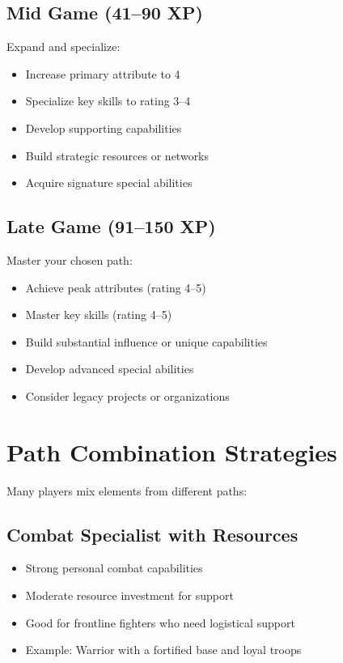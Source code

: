 \documentclass[11pt,twoside,openany]{book}
\begin{document}
\subsection*{Mid Game (41–90 XP)}

Expand and specialize:
\begin{itemize}
\item Increase primary attribute to 4
\item Specialize key skills to rating 3–4
\item Develop supporting capabilities
\item Build strategic resources or networks
\item Acquire signature special abilities
\end{itemize}

\subsection*{Late Game (91–150 XP)}

Master your chosen path:
\begin{itemize}
\item Achieve peak attributes (rating 4–5)
\item Master key skills (rating 4–5)
\item Build substantial influence or unique capabilities
\item Develop advanced special abilities
\item Consider legacy projects or organizations
\end{itemize}

\section*{Path Combination Strategies} 

Many players mix elements from different paths:

\subsection*{Combat Specialist with Resources}

\begin{itemize}
\item Strong personal combat capabilities
\item Moderate resource investment for support
\item Good for frontline fighters who need logistical support
\item Example: Warrior with a fortified base and loyal troops
\end{itemize}
\end{document}
